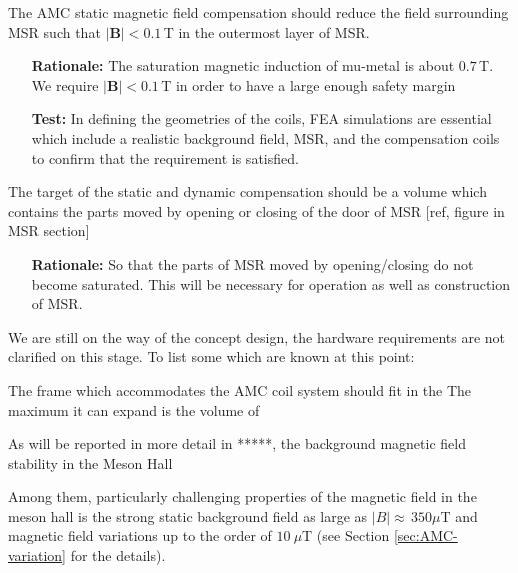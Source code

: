 \begin{RSenumerate}[resume]
\item    The AMC static magnetic field compensation should reduce the field surrounding MSR such that $|\mathbf{B}|<0.1\,$T in the outermost layer of MSR.
\label{RS:amc_static}

\begin{itemize}
    \item[\textbf{Rationale:}]  The saturation magnetic induction of mu-metal is about $ 0.7\,$T. We require $|\mathbf{B}|<0.1\,$T  in order to have a large enough safety margin
    \item[\textbf{Test:}] In defining the geometries of the coils, FEA simulations are essential which include a realistic background field, MSR, and the compensation coils to confirm that the requirement is satisfied. 
    
\end{itemize}
  \item The target of the static and dynamic compensation should be a 
 volume which contains the parts moved by opening or closing of the door of MSR [ref, figure in MSR section] \label{RS:amc_volume}
 \begin{itemize}
    \item[\textbf{Rationale:}] So that the parts of MSR moved by opening/closing do not become saturated. This will be necessary for operation as well as construction of MSR. 
    
\end{itemize}
 

\end{RSenumerate}

We are still on the way of the concept design, the hardware requirements are not clarified  on this stage. To list some which are known at this point: 

\begin{RSenumerate}[resume]
\item The frame which accommodates the AMC coil system should fit in the 
The maximum it can expand is the volume of 
\item 

\end{RSenumerate}
As will be reported in more detail in *****, the background magnetic field stability in the Meson Hall 



Among them,  particularly challenging properties  of the magnetic field in the meson hall is the strong static background field as large as  $|B|\approx\,350\mu$T and magnetic field variations up to the  order of $10~\mu$T (see Section \ref{sec:AMC-variation} for the details).


